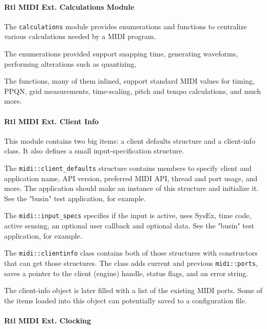 \paragraph{Rtl MIDI Ext. Calculations Module}
\label{paragraph:rtl_midi_extensions_calculations}

   The \texttt{calculations} module provides enumerations and functions to
   centralize various calculations needed by a MIDI program.

   The enumerations provided support snapping time, generating waveforms,
   performing alterations such as quantizing,

   The functions, many of them inlined, support standard MIDI values for timing,
   PPQN, grid measurements, time-scaling, pitch and tempo calculations,
   and much more.

\paragraph{Rtl MIDI Ext. Client Info}
\label{paragraph:rtl_midi_extensions_clientinfo}

   This module contains two big items: a client defaults structure and
   a client-info class. It also defines a small
   input-specification structure.

   The \texttt{midi::client\_defaults} structure contains members to specify
   client and application name, API version, preferred MIDI API, thread and
   port usage, and more.  The application should make an instance of this
   structure and initialize it. See the "busin" test application, for example.

   The \texttt{midi::input\_specs} specifies if the input is active, uses
   SysEx, time code, active sensing, an optional user callback and optional
   data. See the "busin" test application, for example.

   The \texttt{midi::clientinfo} class contains both of those structures with
   constructors that can get those structures. The class adds
   current and previous \texttt{midi::ports}, saves a pointer to the client
   (engine) handle, status flags, and an error string.

   The client-info object is later filled with a list of the existing MIDI
   ports.  Some of the items loaded into this object can potentially saved to a
   configuration file.


\paragraph{Rtl MIDI Ext. Clocking}
\label{paragraph:rtl_midi_extensions_clocking}

